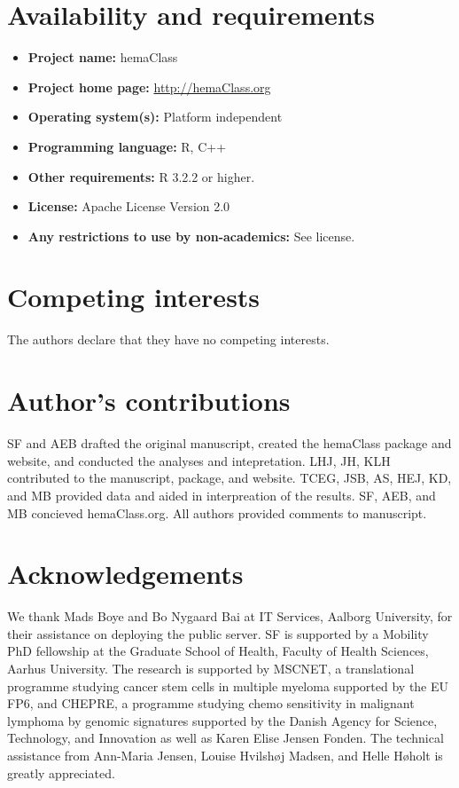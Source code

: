 \documentclass[twocolumn]{bmcart}%
\begin{document}
\begin{backmatter}

\section*{Availability and requirements}
\begin{itemize}
  \item \textbf{Project name:} hemaClass
  \item \textbf{Project home page:} \url{http://hemaClass.org}
  \item \textbf{Operating system(s):} Platform independent
  \item \textbf{Programming language:} \textsf{R}, \textsf{C++}
  \item \textbf{Other requirements:} R 3.2.2 or higher.
  \item \textbf{License:} Apache License Version 2.0
  \item \textbf{Any restrictions to use by non-academics:} See license.
\end{itemize}

\section*{Competing interests}
The authors declare that they have no competing interests.

\section*{Author's contributions}
SF and AEB drafted the original manuscript, created the hemaClass package and website,
and conducted the analyses and intepretation.
LHJ, JH, KLH contributed to the manuscript, package, and website.
TCEG, JSB, AS, HEJ, KD, and MB provided data and aided in interpreation of the results.
SF, AEB, and MB concieved hemaClass.org.
All authors provided comments to manuscript.

\section*{Acknowledgements}
We thank Mads Boye and Bo Nygaard Bai at IT Services, Aalborg University, for their assistance on deploying the public server.
SF is supported by a Mobility PhD fellowship at the Graduate School of Health, Faculty of Health Sciences, Aarhus University.
The research is supported by MSCNET, a translational programme studying cancer stem cells in multiple myeloma supported by the EU FP6, and CHEPRE, a programme studying chemo sensitivity in malignant lymphoma by genomic signatures supported by the Danish Agency for Science, Technology, and Innovation as well as Karen Elise Jensen Fonden.
The technical assistance from Ann-Maria Jensen, Louise Hvilsh{\o}j Madsen, and Helle H{\o}holt is greatly appreciated.


\end{backmatter}
\end{document}

